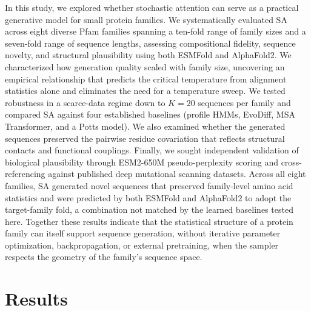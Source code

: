 \documentclass[11pt,onecolumn,twoside,lineno]{pnas-new}
\begin{document}
In this study, we explored whether stochastic attention can serve as a practical generative model for small protein families. We systematically evaluated SA across eight diverse Pfam families spanning a ten-fold range of family sizes and a seven-fold range of sequence lengths, assessing compositional fidelity, sequence novelty, and structural plausibility using both ESMFold and AlphaFold2. We characterized how generation quality scaled with family size, uncovering an empirical relationship that predicts the critical temperature from alignment statistics alone and eliminates the need for a temperature sweep. We tested robustness in a scarce-data regime down to $K{=}20$ sequences per family and compared SA against four established baselines (profile HMMs, EvoDiff, MSA Transformer, and a Potts model). We also examined whether the generated sequences preserved the pairwise residue covariation that reflects structural contacts and functional couplings. Finally, we sought independent validation of biological plausibility through ESM2-650M pseudo-perplexity scoring and cross-referencing against published deep mutational scanning datasets. Across all eight families, SA generated novel sequences that preserved family-level amino acid statistics and were predicted by both ESMFold and AlphaFold2 to adopt the target-family fold, a combination not matched by the learned baselines tested here. Together these results indicate that the statistical structure of a protein family can itself support sequence generation, without iterative parameter optimization, backpropagation, or external pretraining, when the sampler respects the geometry of the family's sequence space.

\section*{Results}
\end{document}
